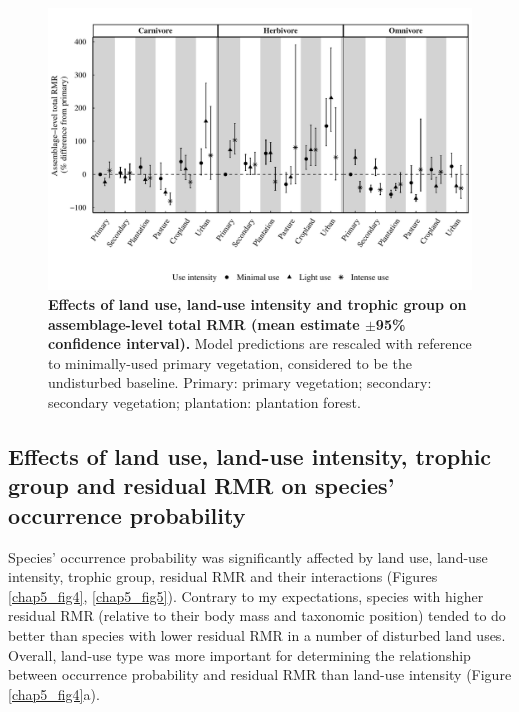 \begin{figure}[h!]
\centering
\includegraphics[scale=0.75]{figures/Chapter5/Minor_corrections/tRMR_imputed}
\caption[Effects of land use, land-use intensity and trophic group on assemblage-level total RMR.]{\textbf{Effects of land use, land-use intensity and trophic group on assemblage-level total RMR (mean estimate $\pm$95\% confidence interval).} Model predictions are rescaled with reference to minimally-used primary vegetation, considered to be the undisturbed baseline. Primary: primary vegetation; secondary: secondary vegetation; plantation: plantation forest.}
\label{chap5_fig3}
\end{figure}

\pagebreak

\subsection{Effects of land use, land-use intensity, trophic group and residual RMR on species' occurrence probability}

Species’ occurrence probability was significantly affected by land use, land-use intensity, trophic group, residual RMR and their interactions (Figures \ref{chap5_fig4}, \ref{chap5_fig5}). Contrary to my expectations, species with higher residual RMR (relative to their body mass and taxonomic position) tended to do better than species with lower residual RMR in a number of disturbed land uses. Overall, land-use type was more important for determining the relationship between occurrence probability and residual RMR than land-use intensity (Figure \ref{chap5_fig4}a).

